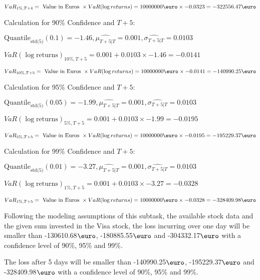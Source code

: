 \indent\indent $VaR_{1\%, T + 4} = \text{ Value in Euros } \times VaR(\log returns) = 10 000 000 \text{\euro} \times-0.0323 = -322556.47 \text{\euro}$\newline




Calculation for 90\% Confidence and $T+5$:

\indent\indent $\text{Quantile}_\text{std(5)}(0.1) = -1.46,\hat{\mu_{T+5|T}} = 0.001, \hat{\sigma_{T+5|T}} = 0.0103$

\indent\indent $VaR(\log \text{returns})_{10\%, T + 5} = 0.001 + 0.0103\times-1.46 = -0.0141$

\indent\indent $VaR_{10\%, T + 5} = \text{ Value in Euros } \times VaR(\log returns) = 10 000 000 \text{\euro} \times-0.0141 = -140990.25 \text{\euro}$\newline




Calculation for 95\% Confidence and $T+5$:

\indent\indent $\text{Quantile}_\text{std(5)}(0.05) = -1.99,\hat{\mu_{T+5|T}} = 0.001, \hat{\sigma_{T+5|T}} = 0.0103$

\indent\indent $VaR(\log \text{returns})_{5\%, T + 5} = 0.001 + 0.0103\times-1.99 = -0.0195$

\indent\indent $VaR_{5\%, T + 5} = \text{ Value in Euros } \times VaR(\log returns) = 10 000 000 \text{\euro} \times-0.0195 = -195229.37 \text{\euro}$\newline




Calculation for 99\% Confidence and $T+5$:

\indent\indent $\text{Quantile}_\text{std(5)}(0.01) = -3.27,\hat{\mu_{T+5|T}} = 0.001, \hat{\sigma_{T+5|T}} = 0.0103$

\indent\indent $VaR(\log \text{returns})_{1\%, T + 5} = 0.001 + 0.0103\times-3.27 = -0.0328$

\indent\indent $VaR_{1\%, T + 5} = \text{ Value in Euros } \times VaR(\log returns) = 10 000 000 \text{\euro} \times-0.0328 = -328409.98 \text{\euro}$\newline


Following the modeling assumptions of this subtask, the available stock data and the given sum invested in the Visa stock, the loss incurring over one day will be smaller than -130610.68$\text{\euro}$, -180885.55$\text{\euro}$  and -304332.17$\text{\euro}$  with a confidence level of 90\%, 95\%  and 99\%.

The loss after 5 days will be smaller than -140990.25$\text{\euro}$, -195229.37$\text{\euro}$  and -328409.98$\text{\euro}$  with a confidence level of 90\%, 95\%  and 99\%.


